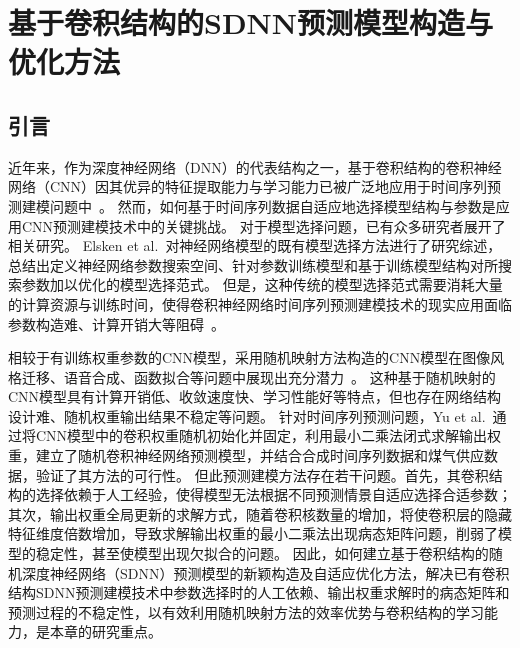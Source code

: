 
\chapter{基于卷积结构的SDNN预测模型构造与优化方法 \label{sec:chapter.cnn}
}

\section{引言}
近年来，作为深度神经网络（DNN）的代表结构之一，基于卷积结构的卷积神经网络（CNN）因其优异的特征提取能力与学习能力已被广泛地应用于时间序列预测建模问题中~\cite{sezer2018algorithmic,cavalliCNNbased2021,sadaei2019short}。
然而，如何基于时间序列数据自适应地选择模型结构与参数是应用CNN预测建模技术中的关键挑战。
对于模型选择问题，已有众多研究者展开了相关研究。
Elsken et al.~\cite{elskenNeural2019a}对神经网络模型的既有模型选择方法进行了研究综述，总结出定义神经网络参数搜索空间、针对参数训练模型和基于训练模型结构对所搜索参数加以优化的模型选择范式。
但是，这种传统的模型选择范式需要消耗大量的计算资源与训练时间，使得卷积神经网络时间序列预测建模技术的现实应用面临参数构造难、计算开销大等阻碍~\cite{zela2018towards}。

相较于有训练权重参数的CNN模型，采用随机映射方法构造的CNN模型在图像风格迁移、语音合成、函数拟合等问题中展现出充分潜力~\cite{hePowerful2016,antogniniAudio2019,yuImpact2019}。
这种基于随机映射的CNN模型具有计算开销低、收敛速度快、学习性能好等特点，但也存在网络结构设计难、随机权重输出结果不稳定等问题。
针对时间序列预测问题，Yu et al.~\cite{yuImpact2019}通过将CNN模型中的卷积权重随机初始化并固定，利用最小二乘法闭式求解输出权重，建立了随机卷积神经网络预测模型，并结合合成时间序列数据和煤气供应数据，验证了其方法的可行性。
但此预测建模方法存在若干问题。首先，其卷积结构的选择依赖于人工经验，使得模型无法根据不同预测情景自适应选择合适参数；其次，输出权重全局更新的求解方式，随着卷积核数量的增加，将使卷积层的隐藏特征维度倍数增加，导致求解输出权重的最小二乘法出现病态矩阵问题，削弱了模型的稳定性，甚至使模型出现欠拟合的问题。
因此，如何建立基于卷积结构的随机深度神经网络（SDNN）预测模型的新颖构造及自适应优化方法，解决已有卷积结构SDNN预测建模技术中参数选择时的人工依赖、输出权重求解时的病态矩阵和预测过程的不稳定性，以有效利用随机映射方法的效率优势与卷积结构的学习能力，是本章的研究重点。

